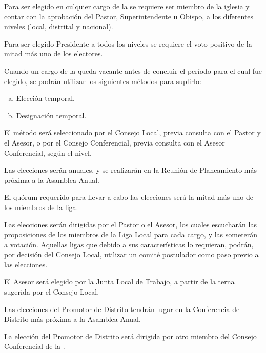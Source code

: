 

\article
\label{requisito-cargos}
Para ser elegido en culquier cargo de la \LMJ{} se requiere ser miembro de la iglesia y contar con la aprobación del Pastor, Superintendente u Obispo, a los diferentes niveles (local, distrital y nacional).

\article
\label{requisito-presidente}
Para ser elegido Presidente a todos los niveles se requiere el voto positivo de la mitad más uno de los electores.

\article
\label{cargos-vacantes}
Cuando un cargo de la \LMJ{} queda vacante antes de concluir el período para el cual fue elegido, se podrán utilizar los siguientes métodos para suplirlo:
\begin{enumerate}[a)]
    \item Elección temporal.
    \item Designación temporal.
\end{enumerate}
El método será seleccionado por el Consejo Local, previa consulta con el Pastor y el Asesor, o por el Consejo Conferencial, previa consulta con el Asesor Conferencial, según el nivel.


\article
Las elecciones serán anuales, y se realizarán en la Reunión de Planeamiento más próxima a la Asamblea Anual.

\article
El quórum requerido para llevar a cabo las elecciones será la mitad más uno de los miembros de la liga.

\article
Las elecciones serán dirigidas por el Pastor o el Asesor, los cuales escucharán las proposiciones de los miembros de la Liga Local para cada cargo, y las someterán a votación. Aquellas ligas que debido a sus características lo requieran, podrán, por decisión del Consejo Local, utilizar un comité postulador como paso previo a las elecciones.

\article
El Asesor será elegido por la Junta Local de Trabajo, a partir de la terna sugerida por el Consejo Local.


\article
Las elecciones del Promotor de Distrito tendrán lugar en la Conferencia de Distrito más próxima a la Asamblea Anual.

\article
\label{direccion-eleccion-promotor}
La elección del Promotor de Distrito será dirigida por otro miembro del Consejo Conferencial de la \LMJ{}.

